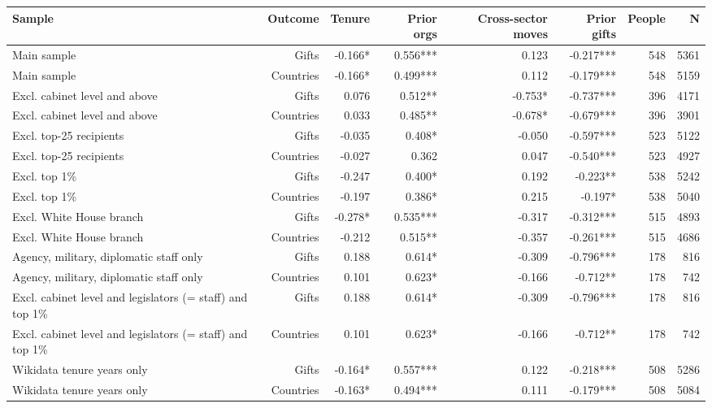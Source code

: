 \begin{tabular}{lrrrrrrr}
\toprule
Sample & Outcome & Tenure & Prior orgs & Cross-sector moves & Prior gifts & People & N \\
\midrule
Main sample & Gifts & -0.166* & 0.556*** & 0.123 & -0.217*** & 548 & 5361 \\
Main sample & Countries & -0.166* & 0.499*** & 0.112 & -0.179*** & 548 & 5159 \\
Excl. cabinet level and above & Gifts & 0.076 & 0.512** & -0.753* & -0.737*** & 396 & 4171 \\
Excl. cabinet level and above & Countries & 0.033 & 0.485** & -0.678* & -0.679*** & 396 & 3901 \\
Excl. top-25 recipients & Gifts & -0.035 & 0.408* & -0.050 & -0.597*** & 523 & 5122 \\
Excl. top-25 recipients & Countries & -0.027 & 0.362 & 0.047 & -0.540*** & 523 & 4927 \\
Excl. top 1\% & Gifts & -0.247 & 0.400* & 0.192 & -0.223** & 538 & 5242 \\
Excl. top 1\% & Countries & -0.197 & 0.386* & 0.215 & -0.197* & 538 & 5040 \\
Excl. White House branch & Gifts & -0.278* & 0.535*** & -0.317 & -0.312*** & 515 & 4893 \\
Excl. White House branch & Countries & -0.212 & 0.515** & -0.357 & -0.261*** & 515 & 4686 \\
Agency, military, diplomatic staff only & Gifts & 0.188 & 0.614* & -0.309 & -0.796*** & 178 & 816 \\
Agency, military, diplomatic staff only & Countries & 0.101 & 0.623* & -0.166 & -0.712** & 178 & 742 \\
Excl. cabinet level and legislators (= staff) and top 1\% & Gifts & 0.188 & 0.614* & -0.309 & -0.796*** & 178 & 816 \\
Excl. cabinet level and legislators (= staff) and top 1\% & Countries & 0.101 & 0.623* & -0.166 & -0.712** & 178 & 742 \\
Wikidata tenure years only & Gifts & -0.164* & 0.557*** & 0.122 & -0.218*** & 508 & 5286 \\
Wikidata tenure years only & Countries & -0.163* & 0.494*** & 0.111 & -0.179*** & 508 & 5084 \\
\bottomrule
\end{tabular}
\par{}
